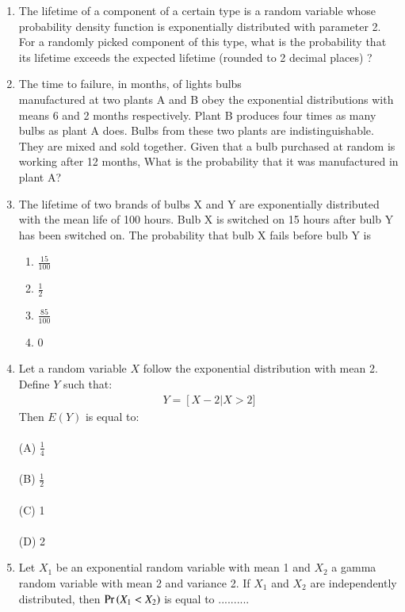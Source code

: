 \begin{enumerate}[label=\thesection.\arabic*.,ref=\thesection.\theenumi]
%
\item The lifetime of a component of a certain type is a random variable whose probability density function is exponentially distributed with parameter 2. For a randomly picked component of this type, what is the probability that its lifetime exceeds the expected lifetime (rounded to 2 decimal places) ?
%
\solution

 \item The time to failure, in months, of lights bulbs \\manufactured at two plants A and B
obey the exponential distributions with means 6 and 2 months respectively. Plant B produces
four times as many bulbs as plant A does. Bulbs from these two plants are indistinguishable.
They are mixed and sold together. Given that a bulb purchased at random is working after 12 months, What is the probability that it was manufactured in plant A?
\\
\solution

 \item The lifetime of two brands of bulbs X and Y are exponentially distributed with the mean life of 100 hours. Bulb X is switched on 15 hours after bulb Y has been switched on. The probability that bulb X fails before bulb Y is 
 \begin{enumerate}[label=(\Alph*)]
     \item $\frac{15}{100}$ \\
     \item $\frac{1}{2}$ \\
     \item $\frac{85}{100}$ \\
     \item 0 
   \end{enumerate}
   \solution
   
%
\item Let a random variable $X$ follow the exponential distribution with mean 2. Define $Y$ such that:
\begin{align}
   Y =  \left[X-2\right|X>2]\nonumber
\end{align}
Then $E(Y)$ is equal to:\\
\\(A) $\frac{1}{4}$\\
\\(B) $\frac{1}{2}$\\
\\(C) 1\\
\\(D) 2\\
%
\item Let $X_{1}$ be	an	exponential	random	variable with mean 1 and $X_{2}$ a gamma	random variable	with mean 2	and	variance 2.	If $X_{1}$ and $X_{2}$ are independently	distributed, then $\Pr\left(X_1 < X_2\right)$ is equal	to ..........	

\end{enumerate}
